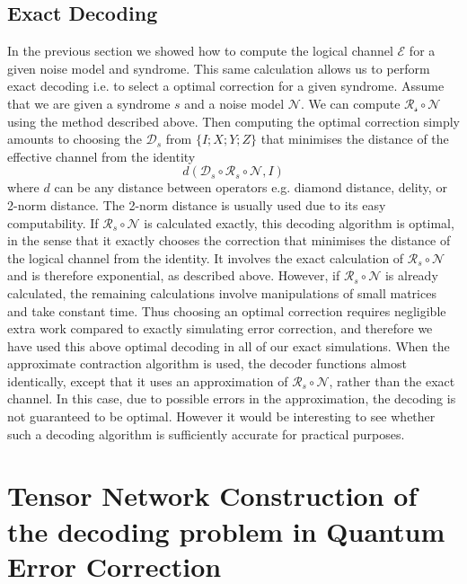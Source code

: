 \subsection*{Exact Decoding}
In the previous section we showed how to compute the logical channel \(\mathcal{E}\) for a given noise model and syndrome. This same calculation allows us to perform exact decoding i.e. to select a optimal correction for a given syndrome. Assume that we are given a syndrome \(s\) and a noise model \(\mathcal{N}\). We can compute \(\mathcal{R_s} \circ \mathcal{N}\) using the method described above. Then computing the optimal correction simply amounts to choosing the \(\mathcal{D}_s\) from \(\{I; X; Y; Z\}\) that minimises the distance of the effective channel from the identity
\begin{equation*}
    d(\mathcal{D}_s \circ \mathcal{R}_s \circ \mathcal{N}, I)
\end{equation*}
where \(d\) can be any distance between operators e.g. diamond distance,  delity, or 2-norm distance. The 2-norm distance is usually used due to its easy computability. If \(\mathcal{R}_s \circ \mathcal{N}\) is calculated exactly, this decoding algorithm is optimal, in the sense that it exactly chooses the correction that minimises the distance of the logical channel from the identity. It involves the exact calculation of \(\mathcal{R}_s \circ \mathcal{N}\) and is therefore exponential, as described above. However, if \(\mathcal{R}_s \circ \mathcal{N}\) is already calculated, the remaining calculations involve manipulations of small matrices and take constant time. Thus choosing an optimal correction requires negligible extra work compared to exactly simulating error correction, and therefore we have used this above optimal decoding in all of our exact simulations. When the approximate contraction algorithm is used, the decoder functions almost identically, except that it uses an approximation of \(\mathcal{R}_s \circ \mathcal{N}\), rather than the exact channel. In this case, due to possible errors in the approximation, the decoding is not guaranteed to be optimal. However it would be interesting to see whether such a decoding algorithm is sufficiently accurate for practical purposes.

\section{Tensor Network Construction of the decoding problem in Quantum Error Correction}



